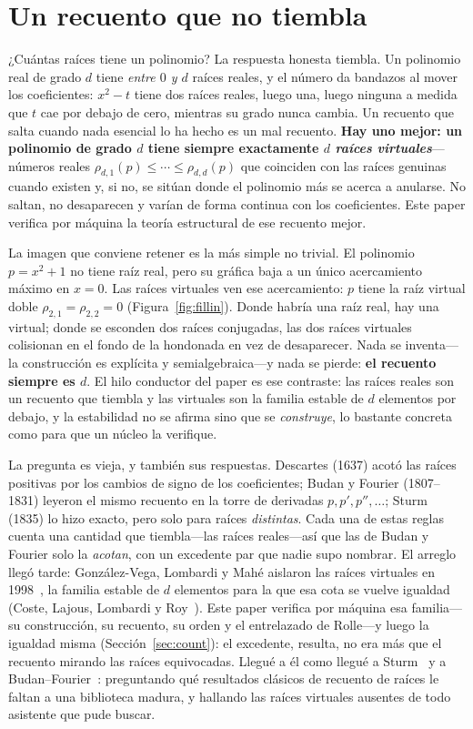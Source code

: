 \documentclass[11pt]{article}
\begin{document}
\section{Un recuento que no tiembla}\label{sec:intro}

¿Cu\'antas ra\'ices tiene un polinomio? La respuesta honesta tiembla. Un polinomio real de grado $d$
tiene \emph{entre $0$ y $d$} ra\'ices reales, y el n\'umero da bandazos al mover los coeficientes:
$x^2-t$ tiene dos ra\'ices reales, luego una, luego ninguna a medida que $t$ cae por debajo de cero,
mientras su grado nunca cambia. Un recuento que salta cuando nada esencial lo ha hecho es un mal
recuento. \textbf{Hay uno mejor: un polinomio de grado $d$ tiene siempre exactamente $d$ \emph{ra\'ices
virtuales}}---n\'umeros reales $\rho_{d,1}(p)\le\cdots\le\rho_{d,d}(p)$ que coinciden con las ra\'ices
genuinas cuando existen y, si no, se sit\'uan donde el polinomio m\'as se acerca a anularse. No saltan,
no desaparecen y var\'ian de forma continua con los coeficientes. Este paper verifica por m\'aquina la
teor\'ia estructural de ese recuento mejor.

La imagen que conviene retener es la m\'as simple no trivial. El polinomio $p=x^2+1$ no tiene ra\'iz
real, pero su gr\'afica baja a un \'unico acercamiento m\'aximo en $x=0$. Las ra\'ices virtuales ven
ese acercamiento: $p$ tiene la ra\'iz virtual doble $\rho_{2,1}=\rho_{2,2}=0$
(Figura~\ref{fig:fillin}). Donde habr\'ia una ra\'iz real, hay una virtual; donde se esconden dos
ra\'ices conjugadas, las dos ra\'ices virtuales colisionan en el fondo de la hondonada en vez de
desaparecer. Nada se inventa---la construcci\'on es expl\'icita y semialgebraica---y nada se pierde:
\textbf{el recuento siempre es $d$}. El hilo conductor del paper es ese contraste: las ra\'ices reales
son un recuento que tiembla y las virtuales son la familia estable de $d$ elementos por debajo, y la
estabilidad no se afirma sino que se \emph{construye}, lo bastante concreta como para que un n\'ucleo
la verifique.

La pregunta es vieja, y tambi\'en sus respuestas. Descartes (1637) acot\'o las ra\'ices positivas por
los cambios de signo de los coeficientes; Budan y Fourier (1807--1831) leyeron el mismo recuento en la
torre de derivadas $p,p',p'',\dots$; Sturm (1835) lo hizo exacto, pero solo para ra\'ices
\emph{distintas}. Cada una de estas reglas cuenta una cantidad que tiembla---las ra\'ices reales---as\'i
que las de Budan y Fourier solo la \emph{acotan}, con un excedente par que nadie supo nombrar. El
arreglo lleg\'o tarde: Gonz\'alez-Vega, Lombardi y Mah\'e aislaron las ra\'ices virtuales en
1998~\cite{glm}, la familia estable de $d$ elementos para la que esa cota se vuelve igualdad (Coste,
Lajous, Lombardi y Roy~\cite{coste}). Este paper verifica por m\'aquina esa familia---su construcci\'on,
su recuento, su orden y el entrelazado de Rolle---y luego la igualdad misma
(Secci\'on~\ref{sec:count}): el excedente, resulta, no era m\'as que el recuento mirando las ra\'ices
equivocadas. Llegu\'e a \'el como llegu\'e a Sturm~\cite{sturmlean} y a Budan--Fourier~\cite{bflean}:
preguntando qu\'e resultados cl\'asicos de recuento de ra\'ices le faltan a una biblioteca madura, y
hallando las ra\'ices virtuales ausentes de todo asistente que pude buscar.
\end{document}
